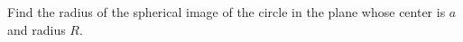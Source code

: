 Find the radius of the spherical image of the circle in the plane whose center is $a$ and radius $R$.\\